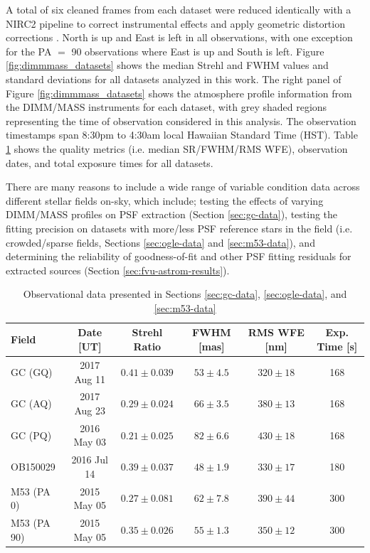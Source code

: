 \documentclass[]{spie}  %
\begin{document}
\indent A total of six cleaned frames from each dataset were reduced identically with a NIRC2 pipeline to correct instrumental effects \cite{ghez:2008a, lu:2008a} and apply geometric distortion corrections \cite{lu:2008a, service:2016a}. North is up and East is left in all observations, with one exception for the PA $=$ 90 observations where East is up and South is left. Figure \ref{fig:dimmmass_datasets} shows the median Strehl and FWHM values and standard deviations for all datasets analyzed in this work. The right panel of Figure \ref{fig:dimmmass_datasets} shows the atmosphere profile information from the DIMM/MASS instruments for each dataset, with grey shaded regions representing the time of observation considered in this analysis. The observation timestamps span 8:30pm to 4:30am local Hawaiian Standard Time (HST). Table \ref{tab:fields-metrics} shows the quality metrics (i.e. median SR/FWHM/RMS WFE), observation dates, and total exposure times for all datasets.

There are many reasons to include a wide range of variable condition data across different stellar fields on-sky, which include; testing the effects of varying DIMM/MASS profiles on PSF extraction (Section \ref{sec:gc-data}), testing the fitting precision on datasets with more/less PSF reference stars in the field (i.e. crowded/sparse fields, Sections \ref{sec:ogle-data} and \ref{sec:m53-data}), and determining the reliability of goodness-of-fit and other PSF fitting residuals for extracted sources (Section \ref{sec:fvu-astrom-results}).

\begin{table}[!h]
\centering
\caption{Observational data presented in Sections \ref{sec:gc-data}, \ref{sec:ogle-data}, and \ref{sec:m53-data}} \label{tab:fields-metrics}
\begin{tabular}{lccccc}
\hline
        Field &  Date [UT] &  Strehl Ratio &  FWHM [mas] &  RMS WFE [nm] & Exp. Time [s] \\\hline\hline
        GC (GQ) &   2017 Aug 11 & $0.41 \pm 0.039$ & $53 \pm 4.5$ & $320 \pm 18$ & 168\\
        GC (AQ) &   2017 Aug 23 & $0.29 \pm 0.024$ & $66 \pm 3.5$ & $380 \pm 13$ & 168\\
        GC (PQ) &   2016 May 03 & $0.21 \pm 0.025$ & $82 \pm 6.6$ & $430 \pm 18$ & 168\\
        OB150029 &    2016 Jul 14 &  $0.39 \pm 0.037$ & $48 \pm 1.9$ & $330 \pm 17$ & 180\\
        M53 (PA 0) &   2015 May 05 &  $0.27 \pm 0.081$ & $62 \pm 7.8$ & $390 \pm 44$ & 300\\
        M53 (PA 90) &   2015 May 05 & $0.35 \pm 0.026$ & $55 \pm 1.3$ & $350 \pm 12$ & 300\\\hline
\end{tabular}
\end{table}
\end{document}
